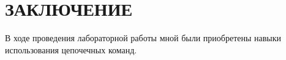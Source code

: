 \section*{ЗАКЛЮЧЕНИЕ}

В ходе проведения лабораторной работы мной были приобретены навыки использования цепочечных
команд.
\newpage

